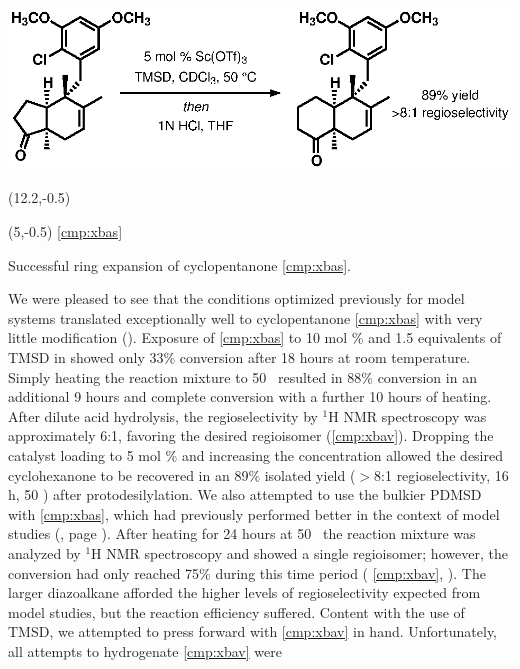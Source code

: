 \begin{Scheme}[b]
  \centering
  \includegraphics[scale=0.8]{chp_singlecarbon/images/homoone}
    \begin{textblock}{1}(12.2,-0.5)  \end{textblock}
    \begin{textblock}{1}(5,-0.5) \textsf{\scriptsize{\ref{cmp:xbas}}}
\end{textblock}
  \caption{Successful ring expansion of cyclopentanone \ref{cmp:xbas}.}
  \label{sch:homoone}
\end{Scheme}
We were pleased to see that the conditions optimized previously for model
systems translated exceptionally well to cyclopentanone \ref{cmp:xbas} with very
little modification (). Exposure of \ref{cmp:xbas} to 10 mol \%
 and 1.5 equivalents of TMSD in  showed only 33\% conversion after 18
hours at room temperature. Simply heating the reaction mixture to 50
\degc~resulted in 88\% conversion in an additional 9 hours and complete
conversion with a further 10 hours of heating. After dilute acid hydrolysis, the
regioselectivity by $^1$H NMR spectroscopy was approximately 6:1,
favoring the desired regioisomer (\ref{cmp:xbav}). Dropping the catalyst loading to 5 mol \% and
increasing the concentration allowed the desired cyclohexanone to be recovered
in an 89\% isolated yield ($>$8:1 regioselectivity, 16 h, 50 \degc) after protodesilylation. We also
attempted to use the bulkier PDMSD with \ref{cmp:xbas}, which had previously performed better in the context of model studies (, page
\pageref{sch:pdmsd}). After heating for 24 hours at 50 \degc\  the reaction mixture was analyzed by
$^1$H NMR spectroscopy and showed a single regioisomer; however, the conversion had only reached
75\% during this time period (\ce{->} \ref{cmp:xbav}, ). The larger
diazoalkane afforded the higher levels of regioselectivity expected from model studies, but the
reaction efficiency suffered. Content with the use of TMSD, we attempted to press forward with
\ref{cmp:xbav} in hand. Unfortunately, all attempts to hydrogenate \ref{cmp:xbav} were

